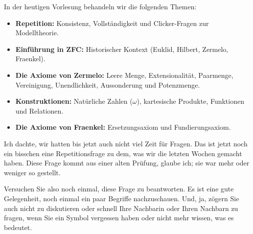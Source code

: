 


\begin{nice-box}
In der heutigen Vorlesung behandeln wir die folgenden Themen:
\begin{itemize}
    \item \textbf{Repetition:} Konsistenz, Vollständigkeit und Clicker-Fragen zur Modelltheorie.
    \item \textbf{Einführung in ZFC:} Historischer Kontext (Euklid, Hilbert, Zermelo, Fraenkel).
    \item \textbf{Die Axiome von Zermelo:} Leere Menge, Extensionalität, Paarmenge, Vereinigung, Unendlichkeit, Aussonderung und Potenzmenge.
    \item \textbf{Konstruktionen:} Natürliche Zahlen ($\omega$), kartesische Produkte, Funktionen und Relationen.
    \item \textbf{Die Axiome von Fraenkel:} Ersetzungsaxiom und Fundierungsaxiom.
\end{itemize}
\end{nice-box}

\begin{spoken-clean}[00:00:00 - 00:01:21]
Ich dachte, wir hatten bis jetzt auch nicht viel Zeit für Fragen. Das ist jetzt noch ein bisschen eine Repetitionsfrage zu dem, was wir die letzten Wochen gemacht haben. Diese Frage kommt aus einer alten Prüfung, glaube ich; sie war mehr oder weniger so gestellt.

Versuchen Sie also noch einmal, diese Frage zu beantworten. Es ist eine gute Gelegenheit, noch einmal ein paar Begriffe nachzuschauen. Und, ja, zögern Sie auch nicht zu diskutieren oder schnell Ihre Nachbarin oder Ihren Nachbarn zu fragen, wenn Sie ein Symbol vergessen haben oder nicht mehr wissen, was es bedeutet.
\end{spoken-clean}


